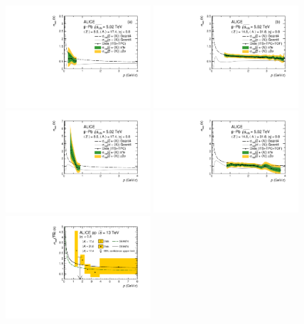 \begin{figure}
    \centering
    \includegraphics[width=0.48\textwidth]{figures/CS_antip_ALICE_ITSTPC.pdf}
    \includegraphics[width=0.48\textwidth]{figures/CS_antip_ALICE_TOF.pdf}
    \includegraphics[width=0.48\textwidth]{figures/CS_antid_ALICE_fullMC_ITSTPC_noc.pdf}
    \includegraphics[width=0.48\textwidth]{figures/CS_antid_ALICE_fullMC_TOF_nod.pdf}
    \includegraphics[width=0.48\textwidth]{figures/Antihelium_inelastic_cross_section.pdf}

\end{figure}
